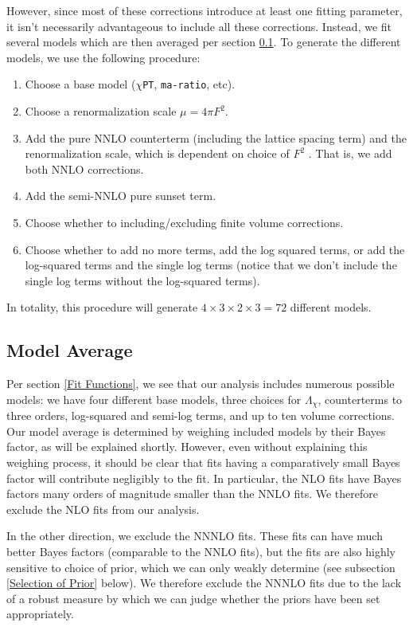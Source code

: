 \documentclass[prd,tightenlines,preprintnumbers,showpacs,superscriptaddress,notitlepage,eqsecnum,floatfix,notitlepage]{revtex4-1}
\begin{document}
However, since most of these corrections introduce at least one fitting parameter, it isn't necessarily advantageous to include all these corrections. Instead, we fit several models which are then averaged per section \ref{section:model_average}. To generate the different models, we use the following procedure:
\begin{enumerate}
	\item Choose a base model (\texttt{$\chi$PT}, \texttt{ma-ratio}, etc).
	\item Choose a renormalization scale $\mu = 4 \pi F^2$.
	\item Add the pure NNLO counterterm (including the lattice spacing term) and the renormalization scale, which is dependent on choice of $F^2$ . That is, we add both NNLO corrections.
	\item Add the semi-NNLO pure sunset term.
	\item Choose whether to including/excluding finite volume corrections.
	\item Choose whether to add no more terms, add the log squared  terms, or add the log-squared terms and the single log terms (notice that we don't include the single log terms without the log-squared terms).
\end{enumerate}

In totality, this procedure will generate $4 \times 3 \times 2 \times 3 = 72$ different models.

\subsection{Model Average} \label{section:model_average}
Per section \ref{Fit Functions}, we see that our analysis includes numerous possible models: we have four different base models, three choices for $\Lambda_\chi$, counterterms to three orders, log-squared and semi-log terms, and up to ten volume corrections. Our model average is determined by weighing included models by their Bayes factor, as will be explained shortly. However, even without explaining this weighing process, it should be clear that fits having a comparatively small Bayes factor will contribute negligibly to the fit. In particular, the NLO fits have Bayes factors many orders of magnitude smaller than the NNLO fits. We therefore exclude the NLO fits from our analysis.

In the other direction, we exclude the NNNLO fits. These fits can have much better Bayes factors (comparable to the NNLO fits), but the fits are also highly sensitive to choice of prior, which we can only weakly determine (see subsection \ref{Selection of Prior} below). We therefore exclude the NNNLO fits due to the lack of a robust measure by which we can judge whether the priors have been set appropriately.
\end{document}
